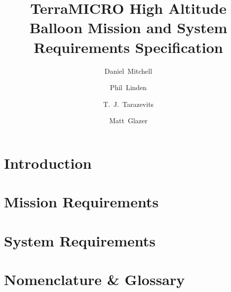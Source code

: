 \documentclass[conf]{new-aiaa}
\title{TerraMICRO High Altitude Balloon Mission and System Requirements
    Specification}
\author{Daniel~Mitchell}
\affil{\github{ddm9599}}
\author{Phil~Linden}
\affil{\github{runphilrun}}
\author{T.~J.~Tarazevits}
\affil{\github{venku22}}
\author{Matt~Glazer}
\affil{\github{mglazer}}
\begin{document}
\maketitle%

\newcommand\subdir{tex} %

\section{Introduction}
    

\section{Mission Requirements}
    

\section{System Requirements}
    

% 
% 

\section{Nomenclature \& Glossary}
    
\end{document}
